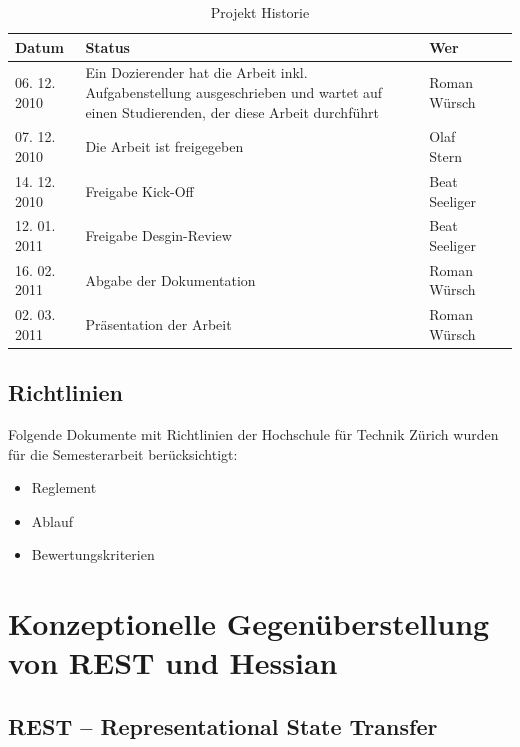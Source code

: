 \documentclass[abstracton, listof=totocnumbered,
bibliography=totocnumbered]{scrreprt}
\begin{document}
  \begin{table}[h]
    \begin{center}
      \begin{tabular}{lp{9cm}ll}
        \toprule
        Datum & Status & Wer \\
        \midrule
        06. 12. 2010 & Ein Dozierender hat die Arbeit inkl. Aufgabenstellung
        ausgeschrieben und wartet auf einen Studierenden, der diese Arbeit
        durchführt & Roman Würsch\\
        07. 12. 2010 & Die Arbeit ist freigegeben & Olaf Stern\\
        14. 12. 2010 & Freigabe Kick-Off & Beat Seeliger\\
        12. 01. 2011 & Freigabe Desgin-Review & Beat Seeliger\\
        16. 02. 2011 & Abgabe der Dokumentation & Roman Würsch\\
        02. 03. 2011 & Präsentation der Arbeit & Roman Würsch\\
        \bottomrule
      \end{tabular}
      \caption{Projekt Historie}
      \label{tab:projekthistorie}
    \end{center}
  \end{table}
  
  \section{Richtlinien}
  Folgende Dokumente mit Richtlinien der Hochschule für Technik Zürich 
  wurden für die Semesterarbeit berücksichtigt:

  \begin{itemize}
      \item Reglement \cite{hsz_reglement}
      \item Ablauf \cite{hsz_ablauf}
      \item Bewertungskriterien \cite{hsz_bewertungskriterien}
  \end{itemize} 
  
  \newpage
  
  \chapter{Konzeptionelle Gegenüberstellung von REST und Hessian}
  
  \section{REST – Representational State Transfer}
  
\end{document}
